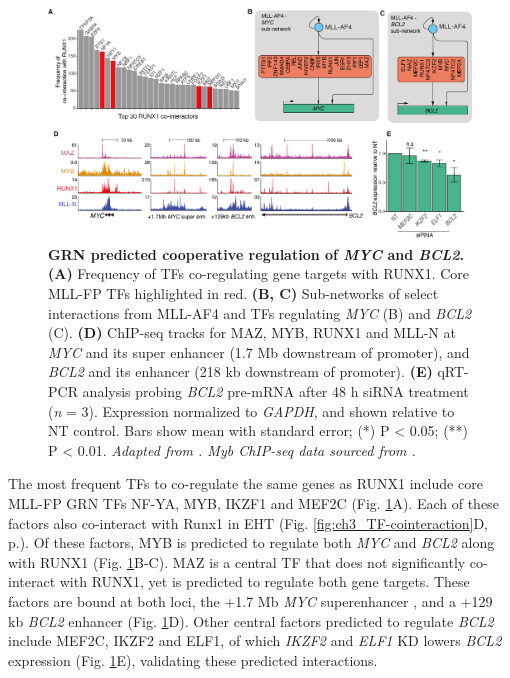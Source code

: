 \begin{figure}[t]
    \centering
    \includegraphics[width=\textwidth,height=\textheight,keepaspectratio]{figures/chapter4/ch4_tf-coop.png}
    \caption[{GRN predicted cooperative regulation of \textit{MYC} and \textit{BCL2}.}]
    {\textbf{GRN predicted cooperative regulation of \textit{MYC} and \textit{BCL2}.} 
    \textbf{(A)} Frequency of TFs co-regulating gene targets with RUNX1. Core MLL-FP TFs highlighted in red. 
    \textbf{(B, C)}  Sub-networks of select interactions from MLL-AF4 and TFs regulating \textit{MYC} (B) and \textit{BCL2} (C). 
    \textbf{(D)} ChIP-seq tracks for MAZ, MYB, RUNX1 and MLL-N at \textit{MYC} and its super enhancer (1.7 Mb downstream of promoter), and \textit{BCL2} and its enhancer (218 kb downstream of promoter). 
    \textbf{(E)} qRT-PCR analysis probing \textit{BCL2} pre-mRNA after 48 h siRNA treatment (\textit{n} = 3). Expression normalized to \textit{GAPDH}, and shown relative to NT control. 
    Bars show mean with standard error; (*) P < 0.05; (**) P < 0.01.
    \textit{Adapted from \cite{harman_kmt2a-aff1_2021}. Myb ChIP-seq data sourced from \citep{godfrey_dot1l_2019}.}
    }
    \label{fig:ch4_tf-coop}
\end{figure}

The most frequent TFs to co-regulate the same genes as RUNX1 include core MLL-FP GRN TFs NF-YA, MYB, IKZF1 and MEF2C (Fig. \ref{fig:ch4_tf-coop}A). Each of these factors also co-interact with Runx1 in EHT (Fig. \ref{fig:ch3_TF-cointeraction}D, p.\pageref{fig:ch3_TF-cointeraction}). Of these factors, MYB is predicted to regulate both \textit{MYC} and \textit{BCL2} along with RUNX1 (Fig. \ref{fig:ch4_tf-coop}B-C). MAZ is a central TF that does not significantly co-interact with RUNX1, yet is predicted to regulate both gene targets. These factors are bound at both loci, the +1.7 Mb \textit{MYC} superenhancer \citep{shi_role_2013}, and a +129 kb \textit{BCL2} enhancer (Fig. \ref{fig:ch4_tf-coop}D). Other central factors predicted to regulate \textit{BCL2} include MEF2C, IKZF2 and ELF1, of which \textit{IKZF2} and \textit{ELF1} KD lowers \textit{BCL2} expression (Fig. \ref{fig:ch4_tf-coop}E), validating these predicted interactions.

